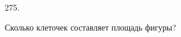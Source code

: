 275. \begin{center}
\begin{figure}[ht!]
\end{figure}
\end{center}
Сколько клеточек составляет площадь фигуры?\\
